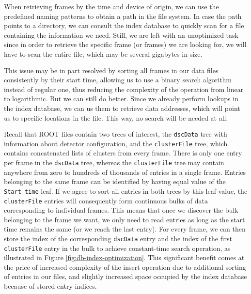 When retrieving frames by the time and device of origin, we can use the predefined naming patterns to obtain a path in the file system. In case the path points to a directory, we can consult the index database to quickly scan for a file containing the information we need. Still, we are left with an unoptimized task since in order to retrieve the specific frame (or frames) we are looking for, we will have to scan the entire file, which may be several gigabytes in size.

This issue may be in part resolved by sorting all frames in our data files consistently by their start time, allowing us to use a binary search algorithm instead of regular one, thus reducing the complexity of the operation from linear to logarithmic. But we can still do better. Since we already perform lookups in the index database, we can us them to retrieve data addresses, which will point us to specific locations in the file. This way, no search will be needed at all.

Recall that ROOT files contain two trees of interest, the \texttt{dscData} tree with information about detector configuration, and the \texttt{clusterFile} tree, which contains concatenated lists of clusters from every frame. There is only one entry per frame in the \texttt{dscData} tree, whereas the \texttt{clusterFile} tree may contain anywhere from zero to hundreds of thousands of entries in a single frame. Entries belonging to the same frame can be identified by having equal value of the \texttt{Start\_time} leaf. If we agree to sort all entries in both trees by this leaf value, the \texttt{clusterFile} entries will consequently form continuous bulks of data corresponding to individual frames. This means that once we discover the bulk belonging to the frame we want, we only need to read entries as long as the start time remains the same (or we reach the last entry). For every frame, we can then store the index of the corresponding \texttt{dscData} entry and the index of the first \texttt{clusterFile} entry in the bulk to achieve constant-time search operation, as illustrated in Figure \ref{fig:db-index-optimization}. This significant benefit comes at the price of increased complexity of the insert operation due to additional sorting of entries in our files, and slightly increased space occupied by the index database because of stored entry indices.

